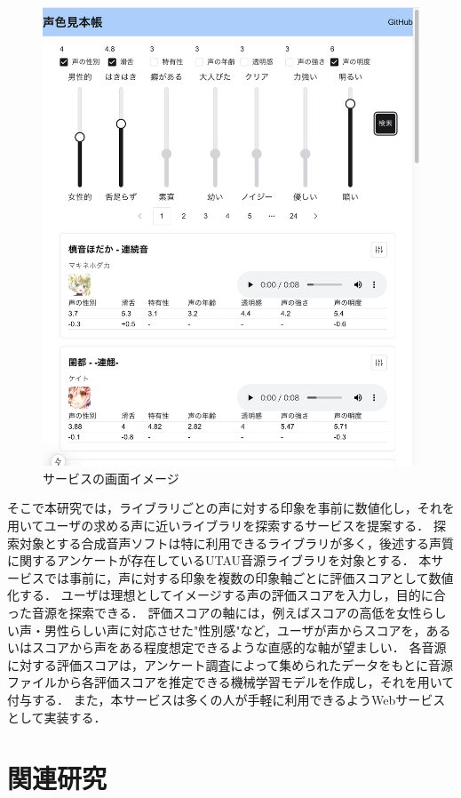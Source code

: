 \documentclass[a4j,8pt,twocolumn]{extarticle}
\begin{document}
\begin{figure}[h]
  \centering
  \includegraphics[width=0.9\linewidth]{fig/site_image.png}
  \caption{サービスの画面イメージ}
  \label{fig:site_image}
\end{figure}

そこで本研究では，ライブラリごとの声に対する印象を事前に数値化し，それを用いてユーザの求める声に近いライブラリを探索するサービスを提案する．
探索対象とする合成音声ソフトは特に利用できるライブラリが多く，後述する声質に関するアンケートが存在しているUTAU音源ライブラリを対象とする．
本サービスでは事前に，声に対する印象を複数の印象軸ごとに評価スコアとして数値化する．
ユーザは理想としてイメージする声の評価スコアを入力し，目的に合った音源を探索できる．
評価スコアの軸には，例えばスコアの高低を女性らしい声・男性らしい声に対応させた"性別感"など，ユーザが声からスコアを，あるいはスコアから声をある程度想定できるような直感的な軸が望ましい．
各音源に対する評価スコアは，アンケート調査によって集められたデータをもとに音源ファイルから各評価スコアを推定できる機械学習モデルを作成し，それを用いて付与する．
また，本サービスは多くの人が手軽に利用できるようWebサービスとして実装する．

\section{関連研究}
\end{document}

